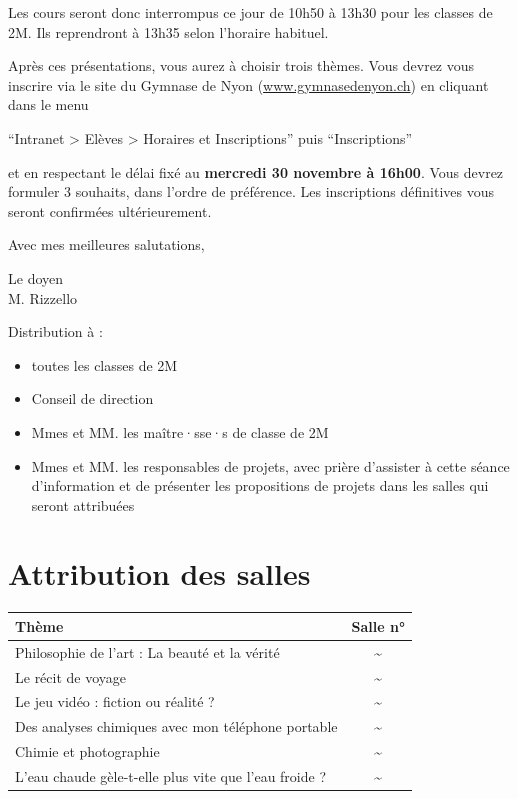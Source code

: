 \documentclass[
  10pt,
  french,
  a5paper,
  openany]{book}
\providecommand{\tightlist}{%
  \setlength{\itemsep}{0pt}\setlength{\parskip}{0pt}}
\newenvironment{signature}{\begin{flushright}}{\end{flushright}}
\begin{document}
Les cours seront donc interrompus ce jour de 10h50 à 13h30 pour les classes de 2M. Ils reprendront à 13h35 selon l'horaire habituel.

\clearpage

Après ces présentations, vous aurez à choisir trois thèmes. Vous devrez vous inscrire via le site du Gymnase de Nyon (\url{www.gymnasedenyon.ch}) en cliquant dans le menu

\begin{center}
``Intranet \textgreater{} Elèves \textgreater{} Horaires et Inscriptions'' puis ``Inscriptions''

\end{center}

et en respectant le délai fixé au \textbf{mercredi 30 novembre à 16h00}. Vous devrez formuler 3 souhaits, dans l'ordre de préférence. Les inscriptions définitives vous seront confirmées ultérieurement.

Avec mes meilleures salutations,

\begin{signature}
Le doyen\\
M. Rizzello

\end{signature}


Distribution à :

\begin{itemize}
\tightlist
\item
  toutes les classes de 2M
\item
  Conseil de direction
\item
  Mmes et MM. les maître·sse·s de classe de 2M
\item
  Mmes et MM. les responsables de projets, avec prière d'assister à cette séance d'information et de présenter les propositions de projets dans les salles qui seront attribuées
\end{itemize}

\hypertarget{attribution-des-salles}{%
\chapter*{Attribution des salles}\label{attribution-des-salles}}

\begin{longtable}[]{@{}lc@{}}
\toprule
Thème & Salle n°\tabularnewline
\midrule
\endhead
Philosophie de l'art : La beauté et la vérité & \textasciitilde{}\tabularnewline
Le récit de voyage & \textasciitilde{}\tabularnewline
Le jeu vidéo : fiction ou réalité ? & \textasciitilde{}\tabularnewline
Des analyses chimiques avec mon téléphone portable & \textasciitilde{}\tabularnewline
Chimie et photographie & \textasciitilde{}\tabularnewline
L'eau chaude gèle-t-elle plus vite que l'eau froide ? & \textasciitilde{}\tabularnewline
\bottomrule
\end{longtable}
\end{document}
